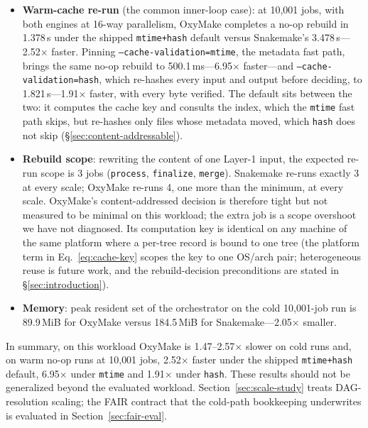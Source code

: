 \documentclass[12pt,a4paper]{article}
\newcommand{\code}[1]{{\texttt{\small\color{inlinecode}#1}}}
\begin{document}
\begin{itemize}
  \item \textbf{Warm-cache re-run} (the common inner-loop case): at 10{,}001 jobs,
    with both engines at 16-way parallelism, OxyMake completes a no-op
    rebuild in 1.378\,s under the shipped \code{mtime+hash} default
    versus Snakemake's 3.478\,s---2.52$\times$ faster. Pinning
    \code{--cache-validation=mtime}, the metadata fast path, brings the
    same no-op rebuild to 500.1\,ms---6.95$\times$ faster---and
    \code{--cache-validation=hash}, which re-hashes every input and
    output before deciding, to 1.821\,s---1.91$\times$ faster, with
    every byte verified. The default sits between the two: it computes the
    cache key and consults the index, which the \code{mtime} fast path
    skips, but re-hashes only files whose metadata moved, which
    \code{hash} does not skip (\S\ref{sec:content-addressable}).
  \item \textbf{Rebuild scope}: rewriting the content of one
    Layer-1 input, the expected re-run scope is 3 jobs
    (\code{process}, \code{finalize}, \code{merge}). Snakemake re-runs
    exactly 3 at every scale; OxyMake re-runs 4, one more than the
    minimum, at every scale. OxyMake's content-addressed decision is
    therefore tight but not measured to be minimal on this workload;
    the extra job is a scope overshoot we have not diagnosed. Its
    computation key is identical on any machine of the
    same platform where a per-tree record is bound to one tree (the
    platform term in Eq.~\ref{eq:cache-key} scopes the key to one
    OS/arch pair; heterogeneous reuse is future work, and the
    rebuild-decision preconditions are stated in
    \S\ref{sec:introduction}).
  \item \textbf{Memory}: peak resident set of the orchestrator on the cold
    10{,}001-job run is 89.9\,MiB for OxyMake versus 184.5\,MiB for
    Snakemake---2.05$\times$ smaller.
\end{itemize}

\noindent In summary, on this workload OxyMake is 1.47--2.57$\times$
slower on cold runs and, on warm no-op runs at 10{,}001 jobs,
2.52$\times$ faster under the shipped \code{mtime+hash} default,
6.95$\times$ under \code{mtime} and 1.91$\times$ under \code{hash}. These results should not be
generalized beyond the evaluated workload.
Section~\ref{sec:scale-study} treats DAG-resolution scaling; the FAIR
contract that the cold-path bookkeeping underwrites is evaluated in
Section~\ref{sec:fair-eval}.
\end{document}
